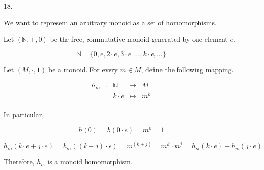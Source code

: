 \documentclass{article}
\begin{document}
\begin{enumerate}
\begin{enumerate}

  \end{enumerate}

  
     
  \item[18.]

    We want to represent an arbitrary monoid as a set of homomorphisms.
    
    Let $(\mathbb{N}, +, 0)$ be the free, commutative monoid generated
    by one element $e$.

    $$\mathbb{N} = \{ 0, e, 2·e, 3·e, …, k·e, … \}$$


    Let $(M,·,1)$ be a monoid. For every $m \in M$, define the
    following mapping.

    \begin{align*}
    h_m & : & \mathbb{N} & →        & M   \\
        &   &     k·e    & \mapsto  & m^k \\
    \end{align*}

    In particular,

    $$h(0) = h(0·e) = m^0 = 1$$ 
    
    $$h_m(k·e + j·e) = h_m((k+j)·e) = m^(k+j) = m^k · m^j = h_m(k·e) + h_m(j·e)$$

    Therefore, $h_m$ is a monoid homomorphism.


\end{enumerate}
\end{document}
